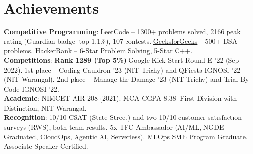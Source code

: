 \section{\textbf{Achievements}}
\vspace{-2pt}
\begin{itemize}[leftmargin=0.05in, label={}]
    \small{\item{
     \textbf{Competitive Programming}{: \href{https://leetcode.com/Sagargupta1610/}{LeetCode} -- 1300+ problems solved, 2166 peak rating (Guardian badge, top 1.1\%), 107 contests. \href{https://www.geeksforgeeks.org/user/sagargupta10/}{GeeksforGeeks} -- 500+ DSA problems. \href{https://www.hackerrank.com/}{HackerRank} -- 6-Star Problem Solving, 5-Star C++.} \\
     \textbf{Competitions}{: \textbf{Rank 1289 (Top 5\%)} Google Kick Start Round E '22 (Sep 2022). 1st place -- Coding Cauldron '23 (NIT Trichy) and QFiesta IGNOSI '22 (NIT Warangal). 2nd place -- Manage the Damage '23 (NIT Trichy) and Trial By Code IGNOSI '22.} \\
     \textbf{Academic}{: NIMCET AIR 208 (2021). MCA CGPA 8.38, First Division with Distinction, NIT Warangal.} \\
     \textbf{Recognition}{: 10/10 CSAT (State Street) and two 10/10 customer satisfaction surveys (RWS), both team results. 5x TFC Ambassador (AI/ML, NGDE Graduated, CloudOps, Agentic AI, Serverless). MLOps SME Program Graduate. Associate Speaker Certified.}
    }}
\end{itemize}
\vspace{-2mm}
